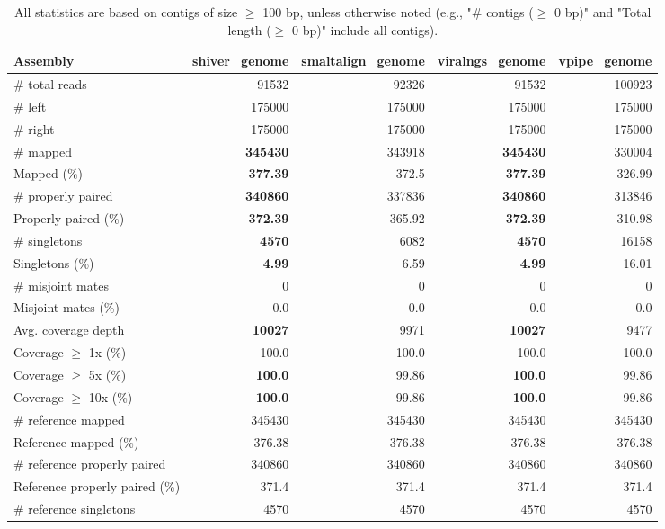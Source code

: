 \documentclass[12pt,a4paper]{article}
\begin{document}
\begin{table}[ht]
\begin{center}
\caption{All statistics are based on contigs of size $\geq$ 100 bp, unless otherwise noted (e.g., "\# contigs ($\geq$ 0 bp)" and "Total length ($\geq$ 0 bp)" include all contigs).}
\begin{tabular}{|l*{4}{|r}|}
\hline
Assembly & shiver\_genome & smaltalign\_genome & viralngs\_genome & vpipe\_genome \\ \hline
\# total reads & 91532 & 92326 & 91532 & 100923 \\ \hline
\# left & 175000 & 175000 & 175000 & 175000 \\ \hline
\# right & 175000 & 175000 & 175000 & 175000 \\ \hline
\# mapped & {\bf 345430} & 343918 & {\bf 345430} & 330004 \\ \hline
Mapped (\%) & {\bf 377.39} & 372.5 & {\bf 377.39} & 326.99 \\ \hline
\# properly paired & {\bf 340860} & 337836 & {\bf 340860} & 313846 \\ \hline
Properly paired (\%) & {\bf 372.39} & 365.92 & {\bf 372.39} & 310.98 \\ \hline
\# singletons & {\bf 4570} & 6082 & {\bf 4570} & 16158 \\ \hline
Singletons (\%) & {\bf 4.99} & 6.59 & {\bf 4.99} & 16.01 \\ \hline
\# misjoint mates & 0 & 0 & 0 & 0 \\ \hline
Misjoint mates (\%) & 0.0 & 0.0 & 0.0 & 0.0 \\ \hline
Avg. coverage depth & {\bf 10027} & 9971 & {\bf 10027} & 9477 \\ \hline
Coverage $\geq$ 1x (\%) & 100.0 & 100.0 & 100.0 & 100.0 \\ \hline
Coverage $\geq$ 5x (\%) & {\bf 100.0} & 99.86 & {\bf 100.0} & 99.86 \\ \hline
Coverage $\geq$ 10x (\%) & {\bf 100.0} & 99.86 & {\bf 100.0} & 99.86 \\ \hline
\# reference mapped & 345430 & 345430 & 345430 & 345430 \\ \hline
Reference mapped (\%) & 376.38 & 376.38 & 376.38 & 376.38 \\ \hline
\# reference properly paired & 340860 & 340860 & 340860 & 340860 \\ \hline
Reference properly paired (\%) & 371.4 & 371.4 & 371.4 & 371.4 \\ \hline
\# reference singletons & 4570 & 4570 & 4570 & 4570 \\ \hline

\end{tabular}
\end{center}
\end{table}
\end{document}
